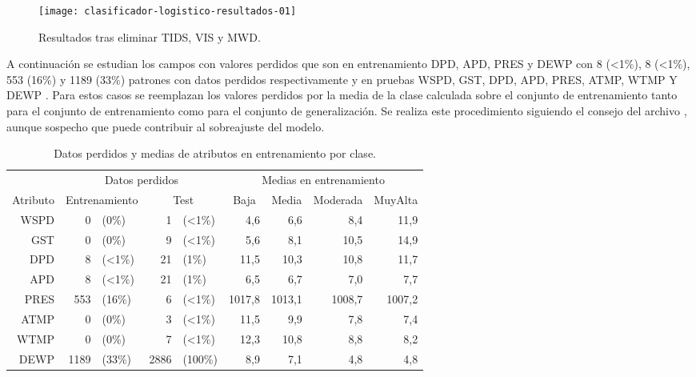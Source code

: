 \begin{figure}[ht]
    \centering
    \texttt{[image: clasificador-logistico-resultados-01]}
    \caption{Resultados tras eliminar TIDS, VIS y MWD.}
    \label{fig:clasificador-logistico-resultados-01}
\end{figure}

A continuación se estudian los campos con valores perdidos que son en entrenamiento DPD, APD, PRES y DEWP con 8 (<1\%), 8 (<1\%), 553 (16\%) y 1189 (33\%) patrones con datos perdidos respectivamente y en pruebas WSPD, GST, DPD, APD, PRES, ATMP, WTMP Y DEWP . Para estos casos se reemplazan los valores perdidos por la media de la clase calculada sobre el conjunto de entrenamiento tanto para el conjunto de entrenamiento como para el conjunto de generalización. Se realiza este procedimiento siguiendo el consejo del archivo , aunque sospecho que puede contribuir al sobreajuste del modelo.

\begin{table}[ht]
    \centering
    \begin{tabular}{|r|rlrl|rrrr|}
    \hline
      \multicolumn{1}{|c|}{} &
      \multicolumn{4}{c|}{Datos perdidos} &
      \multicolumn{4}{c|}{Medias en entrenamiento} \\
      \multicolumn{1}{|c|}{Atributo} &
      \multicolumn{2}{c}{Entrenamiento} &
      \multicolumn{2}{c|}{Test} &
      \multicolumn{1}{c}{Baja} &
      \multicolumn{1}{c}{Media} &
      \multicolumn{1}{c}{Moderada} &
      \multicolumn{1}{c|}{MuyAlta} \\ \hline
      WSPD & 0    & (0\%)  & 1    & (<1\%)  & 4,6    & 6,6    & 8,4    & 11,9   \\ 
      GST  & 0    & (0\%)  & 9    & (<1\%)  & 5,6    & 8,1    & 10,5   & 14,9   \\
      DPD  & 8    & (<1\%) & 21   & (1\%)   & 11,5   & 10,3   & 10,8   & 11,7   \\
      APD  & 8    & (<1\%) & 21   & (1\%)   & 6,5    & 6,7    & 7,0    & 7,7    \\
      PRES & 553  & (16\%) & 6    & (<1\%)  & 1017,8 & 1013,1 & 1008,7 & 1007,2 \\
      ATMP & 0    & (0\%)  & 3    & (<1\%)  & 11,5   & 9,9    & 7,8    & 7,4    \\
      WTMP & 0    & (0\%)  & 7    & (<1\%)  & 12,3   & 10,8   & 8,8    & 8,2    \\
      DEWP & 1189 & (33\%) & 2886 & (100\%) & 8,9    & 7,1    & 4,8    & 4,8    \\\hline
    \end{tabular}
    \caption{Datos perdidos y medias de atributos en entrenamiento por clase.}
    \label{tab:medias-por-clase}
\end{table}

